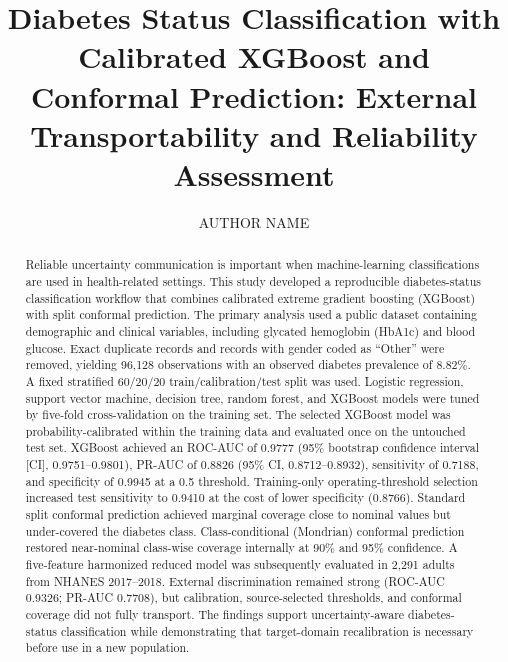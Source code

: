 \documentclass{ieeeaccess}
\begin{document}

\title{Diabetes Status Classification with Calibrated XGBoost and Conformal Prediction: External Transportability and Reliability Assessment}
\author{\uppercase{Author Name}}
\address[1]{Department and Institution, City, Country}


\begin{abstract}
Reliable uncertainty communication is important when machine-learning classifications are used in health-related settings. This study developed a reproducible diabetes-status classification workflow that combines calibrated extreme gradient boosting (XGBoost) with split conformal prediction. The primary analysis used a public dataset containing demographic and clinical variables, including glycated hemoglobin (HbA1c) and blood glucose. Exact duplicate records and records with gender coded as ``Other'' were removed, yielding 96,128 observations with an observed diabetes prevalence of 8.82\%. A fixed stratified 60/20/20 train/calibration/test split was used. Logistic regression, support vector machine, decision tree, random forest, and XGBoost models were tuned by five-fold cross-validation on the training set. The selected XGBoost model was probability-calibrated within the training data and evaluated once on the untouched test set. XGBoost achieved an ROC-AUC of 0.9777 (95\% bootstrap confidence interval [CI], 0.9751--0.9801), PR-AUC of 0.8826 (95\% CI, 0.8712--0.8932), sensitivity of 0.7188, and specificity of 0.9945 at a 0.5 threshold. Training-only operating-threshold selection increased test sensitivity to 0.9410 at the cost of lower specificity (0.8766). Standard split conformal prediction achieved marginal coverage close to nominal values but under-covered the diabetes class. Class-conditional (Mondrian) conformal prediction restored near-nominal class-wise coverage internally at 90\% and 95\% confidence. A five-feature harmonized reduced model was subsequently evaluated in 2,291 adults from NHANES 2017--2018. External discrimination remained strong (ROC-AUC 0.9326; PR-AUC 0.7708), but calibration, source-selected thresholds, and conformal coverage did not fully transport. The findings support uncertainty-aware diabetes-status classification while demonstrating that target-domain recalibration is necessary before use in a new population.
\end{abstract}
\end{document}
